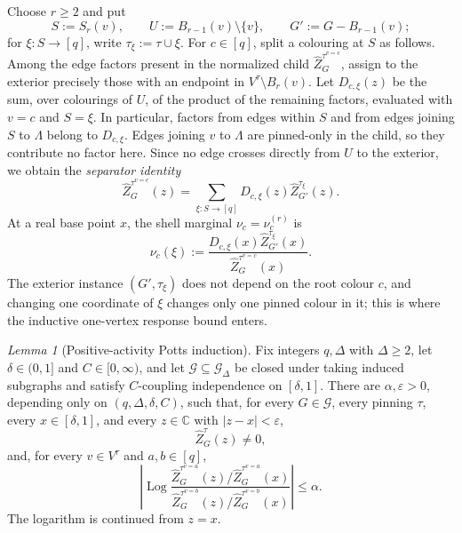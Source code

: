 \documentclass[11pt,reqno]{article}
\theoremstyle{plain}
\newtheorem{lemma}[theorem]{Lemma}
\theoremstyle{definition}
\theoremstyle{remark}
\newtheorem{lemma}[lemma]{Lemma}
\theoremstyle{definition}
\theoremstyle{remark}
\newcommand{\C}{\mathbb{C}}
\newcommand{\eps}{\varepsilon}
\newcommand{\Log}{\operatorname{Log}}          %
\newcommand{\Deg}{\Delta}                        %
\newcommand{\colours}{[q]}                        %
\newcommand{\Gdeg}{\mathcal{G}_{\Deg}}
\newcommand{\nZpin}[2]{\widehat Z_{#1}^{#2}}
\begin{document}
Choose \(r\ge2\) and put
\[
  S:=S_r(v),\qquad
  U:=B_{r-1}(v)\setminus\{v\},\qquad
  G':=G-B_{r-1}(v);
\]
for \(\xi\colon S\to\colours\), write \(\tau_\xi:=\tau\cup\xi\).
For \(c\in\colours\), split a colouring at \(S\) as follows.  Among the
edge factors present in the normalized child \(\nZpin{G}{\tau^{v=c}}\),
assign to the exterior precisely those with an endpoint in
\(V^\tau\setminus B_r(v)\).  Let
\(D_{c,\xi}(z)\) be the sum, over colourings of \(U\), of the product of
the remaining factors, evaluated with \(v=c\) and \(S=\xi\).  In particular, factors from edges within \(S\)
and from edges joining \(S\) to \(\Lambda\) belong to \(D_{c,\xi}\).
Edges joining \(v\) to \(\Lambda\) are pinned-only in the child, so they
contribute no factor here.  Since no edge crosses directly from
\(U\) to the exterior, we obtain the \emph{separator identity}
\begin{equation}\label{eq:potts-separator-defined}
  \nZpin{G}{\tau^{v=c}}(z)
  =\sum_{\xi\colon S\to\colours}
      D_{c,\xi}(z)\nZpin{G'}{\tau_\xi}(z).
\end{equation}
At a real base point \(x\), the shell marginal \(\nu_c=\nu_c^{(r)}\) is
\begin{equation}\label{eq:potts-shell-marginal-defined}
  \nu_c(\xi)
  :=\frac{D_{c,\xi}(x)\nZpin{G'}{\tau_\xi}(x)}
          {\nZpin{G}{\tau^{v=c}}(x)}.
\end{equation}
The exterior instance \((G',\tau_\xi)\) does not depend on the root
colour \(c\), and changing one coordinate of \(\xi\) changes only one
pinned colour in it; this is where the inductive one-vertex response bound
enters.
\begin{lemma}[Positive-activity Potts induction]
\label{lem:potts-positive-response}
Fix integers \(q,\Deg\) with \(\Deg\ge2\), let \(\delta\in(0,1]\) and
\(C\in[0,\infty)\), and let
\(\mathcal G\subseteq\Gdeg\) be closed under taking induced subgraphs and satisfy
\(C\)-coupling independence on \([\delta,1]\).  There are
\(\alpha,\eps>0\), depending only on \((q,\Deg,\delta,C)\), such that, for
every \(G\in\mathcal G\), every pinning \(\tau\), every
\(x\in[\delta,1]\), and every \(z\in\C\) with \(|z-x|<\eps\),
\[
  \nZpin{G}{\tau}(z)\ne0,
\]
and, for every \(v\in V^\tau\) and \(a,b\in\colours\),
\begin{equation}\label{eq:potts-response-invariant}
  \left|\Log
  \frac{\nZpin{G}{\tau^{v=a}}(z)/\nZpin{G}{\tau^{v=a}}(x)}
       {\nZpin{G}{\tau^{v=b}}(z)/\nZpin{G}{\tau^{v=b}}(x)}\right|
  \le\alpha.
\end{equation}
The logarithm is continued from \(z=x\).
\end{lemma}
\end{document}
